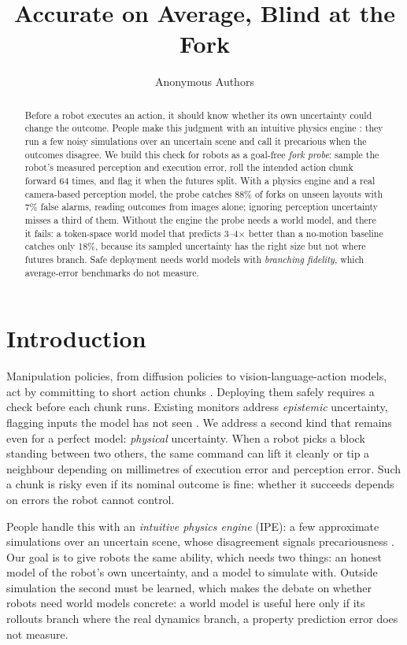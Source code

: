\documentclass{article}
\title{Accurate on Average, Blind at the Fork}
\author{Anonymous Authors}
\begin{document}
\maketitle

\begin{abstract}
Before a robot executes an action, it should know whether its own uncertainty could change the outcome.
People make this judgment with an intuitive physics engine \citep{battaglia2013simulation}: they run a
few noisy simulations over an uncertain scene and call it precarious when the outcomes disagree. We
build this check for robots as a goal-free \emph{fork probe}: sample the robot's measured perception and
execution error, roll the intended action chunk forward 64 times, and flag it when the futures split.
With a physics engine and a real camera-based perception model, the probe catches 88\% of forks on
unseen layouts with 7\% false alarms, reading outcomes from images alone; ignoring perception uncertainty
misses a third of them. Without the engine the probe needs a world model, and there it fails: a
token-space world model that predicts 3--4$\times$ better than a no-motion baseline catches only 18\%,
because its sampled uncertainty has the right size but not where futures branch. Safe deployment needs world models with \emph{branching
fidelity}, which average-error benchmarks do not measure.
\end{abstract}


\section{Introduction}
Manipulation policies, from diffusion policies to vision-language-action models, act by committing to
short action chunks \citep{chi2023diffusion,zhao2023act,black2024pi0}. Deploying them safely requires a
check before each chunk runs. Existing monitors address \emph{epistemic} uncertainty, flagging inputs the
model has not seen \citep{seo2025uncertainty,xu2025failure}. We address a second kind that remains even
for a perfect model: \emph{physical} uncertainty. When a robot picks a block standing between two
others, the same command can lift it cleanly or tip a neighbour depending on millimetres of execution error and
perception error. Such a chunk is risky even if its nominal outcome is fine: whether it succeeds depends on errors the
robot cannot control.

People handle this with an \emph{intuitive physics engine} (IPE): a few approximate simulations over an
uncertain scene, whose disagreement signals precariousness
\citep{battaglia2013simulation,smith2013sources,sanborn2013reconciling}. Our goal is to give robots the
same ability, which needs two things: an honest model of the robot's own uncertainty, and a model to
simulate with. Outside simulation the second must be learned, which makes the debate on whether robots
need world models concrete: a world model is useful here only if its rollouts branch where the real
dynamics branch, a property prediction error does not measure.
\end{document}
